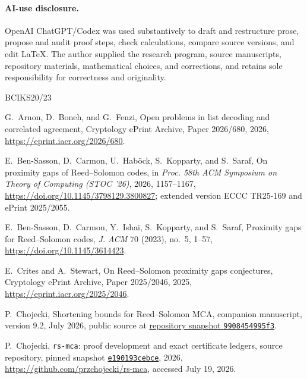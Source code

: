 \documentclass[a4paper,11pt]{amsart}
\theoremstyle{remark}
\begin{document}
\paragraph{AI-use disclosure.}
OpenAI ChatGPT/Codex was used substantively to draft and restructure prose,
propose and audit proof steps, check calculations, compare source versions,
and edit \LaTeX.  The author supplied the research program, source
manuscripts, repository materials, mathematical choices, and corrections,
and retains sole responsibility for correctness and originality.

\begin{thebibliography}{BCIKS20/23}
\footnotesize

G.~Arnon, D.~Boneh, and G.~Fenzi,
\newblock Open problems in list decoding and correlated agreement,
\newblock Cryptology ePrint Archive, Paper 2026/680, 2026,
\newblock \url{https://eprint.iacr.org/2026/680}.

E.~Ben-Sasson, D.~Carmon, U.~Hab\"ock, S.~Kopparty, and S.~Saraf,
\newblock On proximity gaps of Reed--Solomon codes,
\newblock in \emph{Proc. 58th ACM Symposium on Theory of Computing
(STOC '26)}, 2026, 1157--1167,
\newblock \url{https://doi.org/10.1145/3798129.3800827};
extended version ECCC TR25-169 and ePrint 2025/2055.

E.~Ben-Sasson, D.~Carmon, Y.~Ishai, S.~Kopparty, and S.~Saraf,
\newblock Proximity gaps for Reed--Solomon codes,
\newblock \emph{J. ACM} 70 (2023), no.~5, 1--57,
\newblock \url{https://doi.org/10.1145/3614423}.

E.~Crites and A.~Stewart,
\newblock On Reed--Solomon proximity gaps conjectures,
\newblock Cryptology ePrint Archive, Paper 2025/2046, 2025,
\newblock \url{https://eprint.iacr.org/2025/2046}.

P.~Chojecki,
\newblock Shortening bounds for Reed--Solomon MCA,
\newblock companion manuscript, version 9.2, July 2026,
\newblock public source at
\href{https://github.com/przchojecki/rs-mca/blob/9908454995f3f195cfe748f35a1135211609d066/experimental/RS_MCA_Paving_v9.2.tex}
{repository snapshot \texttt{9908454995f3}}.

P.~Chojecki,
\newblock \texttt{rs-mca}: proof development and exact certificate ledgers,
\newblock source repository, pinned snapshot
\href{https://github.com/przchojecki/rs-mca/tree/e190193cebced1d3752d068a1c24136bc69a85d9}{\texttt{e190193cebce}}, 2026,
\newblock \url{https://github.com/przchojecki/rs-mca}, accessed July 19, 2026.


\end{thebibliography}
\end{document}
